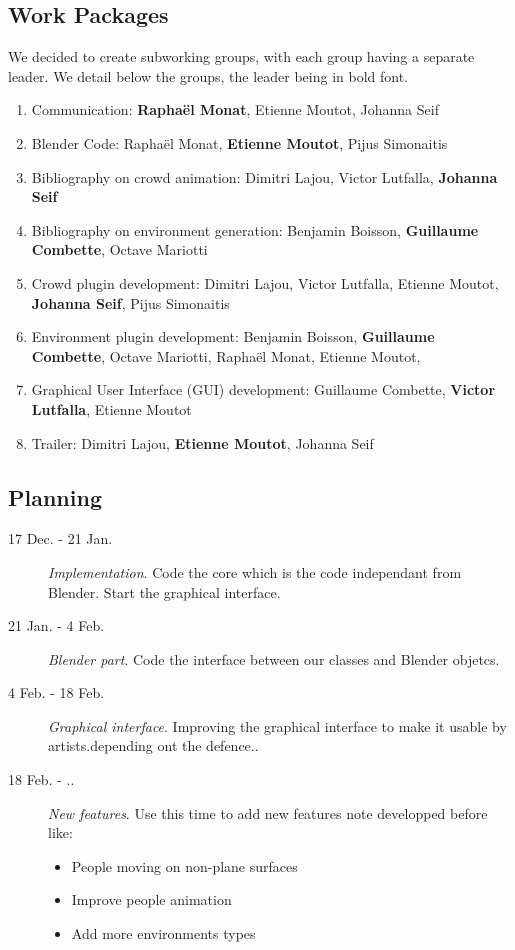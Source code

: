 \documentclass[a4paper,11pt]{article}
\newcommand\bb{Benjamin Boisson}
\newcommand\gc{Guillaume Combette}
\newcommand\dl{Dimitri Lajou}
\newcommand\vl{Victor Lutfalla}
\newcommand\om{Octave Mariotti}
\newcommand\mr{Raphaël Monat} %
\newcommand\me{Etienne Moutot} %
\newcommand\js{Johanna Seif}
\newcommand\ps{Pijus Simonaitis}
\begin{document}
\subsection{Work Packages}
We decided to create subworking groups, with each group having a separate leader. We detail below the groups, the leader being in bold font.

\begin{enumerate}[label=WP\arabic*:, start=0]
\item Communication: \textbf{\mr}, \me, \js
\item Blender Code: \mr, \textbf{\me}, \ps
\item Bibliography on crowd animation: \dl, \vl, \textbf{\js}
\item Bibliography on environment generation: \bb, \textbf{\gc}, \om
\item Crowd plugin development: \dl, \vl, \me, \textbf{\js}, \ps
\item Environment plugin development: \bb, \textbf{\gc}, \om, \mr, \me,
\item Graphical User Interface (GUI) development: \gc, \textbf{\vl}, \me
\item Trailer: \dl, \textbf{\me}, \js
\end{enumerate}

\subsection{Planning}
\begin{description}
  \item[17 Dec. - 21 Jan.] \textit{Implementation}. Code the core which is the code independant from Blender. Start the graphical interface.
  \item[21 Jan. - 4 Feb.] \textit{Blender part}. Code the interface between our classes and Blender objetcs.
  \item[4 Feb. - 18 Feb.] \textit{Graphical interface}. Improving the graphical interface to make it usable by artists.depending ont the defence..
  \item[18 Feb. - ..] \textit{New features}.
Use this time to add new features note developped before like:
  \begin{itemize}
    \item People moving on non-plane surfaces
    \item Improve people animation
    \item Add more environments types
  \end{itemize}
\end{description}











\begingroup




\endgroup
\end{document}

